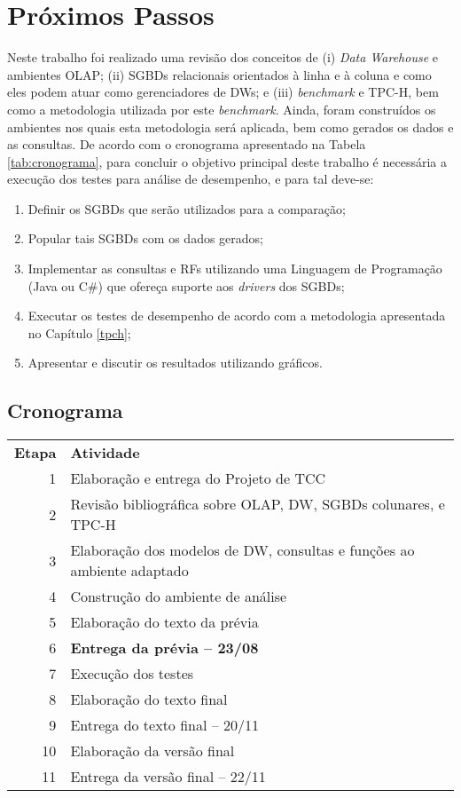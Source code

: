 \chapter{Próximos Passos}
\label{cronograma}

Neste trabalho foi realizado uma revisão dos conceitos de (i) \textit{Data Warehouse} e ambientes OLAP; (ii) SGBDs relacionais orientados à linha e à coluna e como eles podem atuar como gerenciadores de DWs; e (iii) \textit{benchmark} e TPC-H, bem como a metodologia utilizada por este \textit{benchmark}. Ainda, foram construídos os ambientes nos quais esta metodologia será aplicada, bem como gerados os dados e as consultas. De acordo com o cronograma apresentado na Tabela \ref{tab:cronograma}, para concluir o objetivo principal deste trabalho é necessária a execução dos testes para análise de desempenho, e para tal deve-se:

\begin{enumerate}
    \item Definir os SGBDs que serão utilizados para a comparação;
    \item Popular tais SGBDs com os dados gerados;
    \item Implementar as consultas e RFs utilizando uma Linguagem de Programação (Java ou C\#) que ofereça suporte aos \textit{drivers} dos SGBDs;
    \item Executar os testes de desempenho de acordo com a metodologia apresentada no Capítulo \ref{tpch};
    \item Apresentar e discutir os resultados utilizando gráficos.
\end{enumerate}

\section{Cronograma}

\begin{tabular}{r|l}
    \textbf{Etapa} & \textbf{Atividade} \\
	1 & Elaboração e entrega do Projeto de TCC \\
	2 & Revisão bibliográfica sobre OLAP, DW, SGBDs colunares, e TPC-H \\
	3 & Elaboração dos modelos de DW, consultas e funções ao ambiente adaptado \\
	4 & Construção do ambiente de análise \\
	5 & Elaboração do texto da prévia \\
	6 & \textbf{Entrega da prévia -- 23/08} \\
	7 & Execução dos testes \\
	8 & Elaboração do texto final \\
	9 & Entrega do texto final -- 20/11 \\
	10 & Elaboração da versão final \\
	11 & Entrega da versão final -- 22/11 \\
\end{tabular}

